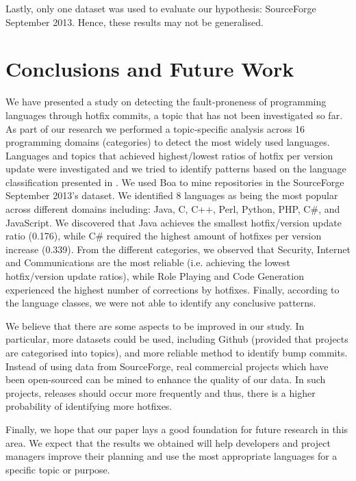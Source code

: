 \documentclass{sig-alternate}
\begin{document}
Lastly, only one dataset was used to evaluate our hypothesis: SourceForge September 2013. Hence, these results may not be generalised.

\section{Conclusions and Future Work}
We have presented a study on detecting the fault-proneness of programming languages through hotfix commits, a topic that has not been investigated so far. As part of our research we performed a topic-specific analysis across 16 programming domains (categories) to detect the most widely used languages. Languages and topics that achieved highest/lowest ratios of hotfix per version update were investigated and we tried to identify patterns based on the language classification presented in \cite{Ray2014}. We used Boa to mine repositories in the SourceForge September 2013's dataset. %
We identified 8 languages as being the most popular across different domains including: Java, C, C++, Perl, Python, PHP, C\#, and JavaScript. We discovered that Java achieves the smallest hotfix/version update ratio (0.176), while C\# required the highest amount of hotfixes per version increase (0.339). From the different categories, we observed that Security, Internet and Communications are the most reliable (i.e. achieving the lowest hotfix/version update ratios), while Role Playing and Code Generation experienced the highest number of corrections by hotfixes. Finally, according to the language classes, we were not able to identify any conclusive patterns.

We believe that there are some aspects to be improved in our study. In particular, more datasets could be used, including Github (provided that projects are categorised into topics), and more reliable method to identify bump commits. Instead of using data from SourceForge, real commercial projects which have been open-sourced can be mined to enhance the quality of our data. In such projects, releases should occur more frequently and thus, there is a higher probability of identifying more hotfixes.

Finally, we hope that our paper lays a good foundation for future research in this area. We expect that the results we obtained will help developers and project managers improve their planning and use the most appropriate languages for a specific topic or purpose.


 

\end{document}
